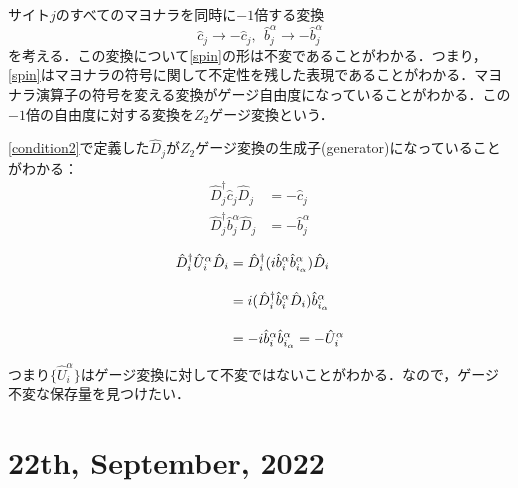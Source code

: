 \documentclass[dvipdfmx,autodetect-engine]{jsarticle}
\newcommand{\nn}{\notag \\}
\begin{document}
サイト$j$のすべてのマヨナラを同時に$-1$倍する変換
\begin{equation}
    \hat{c}_j\to-\hat{c}_j,\ \ \hat{b}_{j}^{\alpha}\to-\hat{b}_{j}^{\alpha}
\end{equation}
を考える．この変換について\eqref{spin}の形は不変であることがわかる．つまり，\eqref{spin}はマヨナラの符号に関して不定性を残した表現であることがわかる．マヨナラ演算子の符号を変える変換がゲージ自由度になっていることがわかる．この$-1$倍の自由度に対する変換を$Z_2$ゲージ変換という．


\eqref{condition2}で定義した$\hat{D}_j$が$Z_2$ゲージ変換の生成子(generator)になっていることがわかる：
\begin{align}
    \hat{D}_j^{\dagger} \hat{c}_j\hat{D}_j &= -\hat{c}_j\\[10pt]
    \hat{D}_j^{\dagger} \hat{b}_j^{\alpha}\hat{D}_j &= -\hat{b}_j^{\alpha}
\end{align}

\begin{align}
    \hat{D}_i^{\dagger} \hat{U}_i^{\alpha}\hat{D}_i
    &=\hat{D}_i^{\dagger} (i\hat{b}_i^{\alpha}\hat{b}_{i_\alpha}^{\alpha})\hat{D}_i\nn[10pt]
    &=i(\hat{D}_i^{\dagger}\hat{b}_i^{\alpha}\hat{D}_i)\hat{b}_{i_\alpha}^{\alpha}\nn[10pt]
    &=-i\hat{b}_i^{\alpha}\hat{b}_{i_\alpha}^{\alpha}
    =-\hat{U}_{i}^{\alpha}
\end{align}

つまり$\{\hat{U}_{i}^{\alpha}\}$はゲージ変換に対して不変ではないことがわかる．なので，ゲージ不変な保存量を見つけたい．


\section*{22th, September, 2022}
\end{document}
